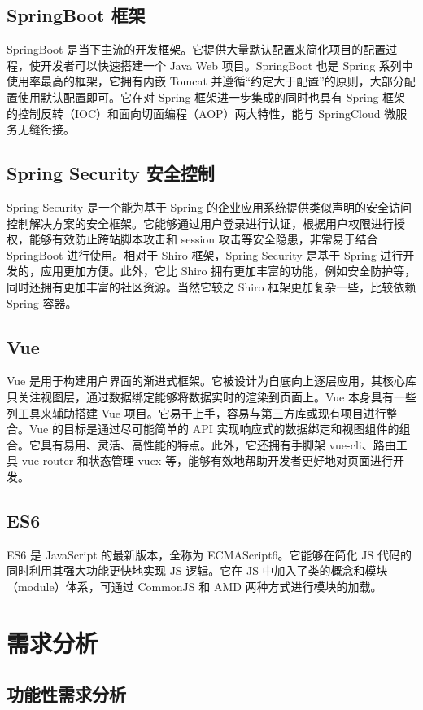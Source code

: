 \documentclass{izdthesis}
\begin{document}
\section{SpringBoot 框架}
SpringBoot 是当下主流的开发框架。它提供大量默认配置来简化项目的配置过程，使开发者可以快速搭建一个 Java Web 项目。SpringBoot 也是 Spring 系列中使用率最高的框架，它拥有内嵌 Tomcat 并遵循“约定大于配置”的原则，大部分配置使用默认配置即可。它在对 Spring 框架进一步集成的同时也具有 Spring 框架的控制反转（IOC）和面向切面编程（AOP）两大特性，能与 SpringCloud 微服务无缝衔接。

\section{Spring Security 安全控制}
Spring Security 是一个能为基于 Spring 的企业应用系统提供类似声明的安全访问控制解决方案的安全框架。它能够通过用户登录进行认证，根据用户权限进行授权，能够有效防止跨站脚本攻击和 session 攻击等安全隐患，非常易于结合 SpringBoot 进行使用。相对于 Shiro 框架，Spring Security 是基于 Spring 进行开发的，应用更加方便。此外，它比 Shiro 拥有更加丰富的功能，例如安全防护等，同时还拥有更加丰富的社区资源。当然它较之 Shiro 框架更加复杂一些，比较依赖 Spring 容器。

\section{Vue}
Vue 是用于构建用户界面的渐进式框架。它被设计为自底向上逐层应用，其核心库只关注视图层，通过数据绑定能够将数据实时的渲染到页面上。Vue 本身具有一些列工具来辅助搭建 Vue 项目。它易于上手，容易与第三方库或现有项目进行整合。Vue 的目标是通过尽可能简单的 API 实现响应式的数据绑定和视图组件的组合。它具有易用、灵活、高性能的特点。此外，它还拥有手脚架 vue-cli、路由工具 vue-router 和状态管理 vuex 等，能够有效地帮助开发者更好地对页面进行开发。

\section{ES6}
ES6 是 JavaScript 的最新版本，全称为 ECMAScript6。它能够在简化 JS 代码的同时利用其强大功能更快地实现 JS 逻辑。它在 JS 中加入了类的概念和模块（module）体系，可通过 CommonJS 和 AMD 两种方式进行模块的加载。

\chapter{需求分析}

\section{功能性需求分析}
\end{document}

